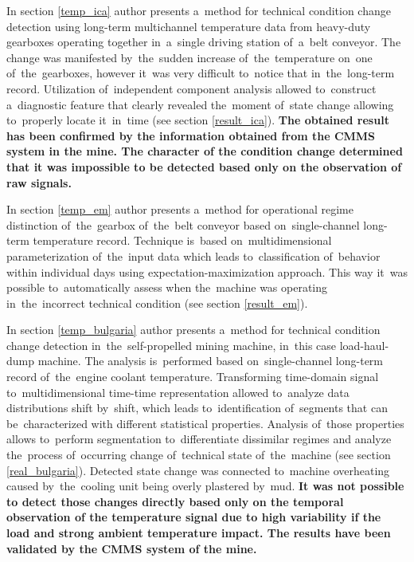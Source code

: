 In section \ref{temp_ica} author presents a~method for technical condition change detection using long-term multichannel temperature data from heavy-duty gearboxes operating together in~a~single driving station of~a~belt conveyor. The change was manifested by~the~sudden increase of~the~temperature on~one of~the~gearboxes, however it~was very difficult to~notice that in~the~long-term record. Utilization of~independent component analysis allowed to~construct a~diagnostic feature that clearly revealed the~moment of~state change allowing to~properly locate it~in~time (see section \ref{result_ica}). \textbf{The obtained result has been confirmed by the information obtained from the CMMS system in the mine. The character of the condition change determined that it was impossible to be detected based only on the observation of raw signals.}

In section \ref{temp_em} author presents a~method for operational regime distinction of~the~gearbox of~the~belt conveyor based on~single-channel long-term temperature record. Technique is~based on~multidimensional parameterization of~the~input data which leads to~classification of~behavior within individual days using expectation-maximization approach. This way it~was possible to~automatically assess when the~machine was operating in~the~incorrect technical condition (see section \ref{result_em}). 

In section \ref{temp_bulgaria} author presents a~method for technical condition change detection in~the~self-propelled mining machine, in~this case load-haul-dump machine. The analysis is~performed based on~single-channel long-term record of~the~engine coolant temperature. Transforming time-domain signal to~multidimensional time-time representation allowed to~analyze data distributions shift by~shift, which leads to~identification of~segments that can be~characterized with different statistical properties. Analysis of~those properties allows to~perform segmentation to~differentiate dissimilar regimes and analyze the~process of~occurring change of~technical state of~the~machine (see section \ref{real_bulgaria}). Detected state change was connected to~machine overheating caused by~the~cooling unit being overly plastered by~mud. \textbf{It was not possible to detect those changes directly based only on the temporal observation of the temperature signal due to high variability if the load and strong ambient temperature impact. The results have been validated by the CMMS system of the mine.}

